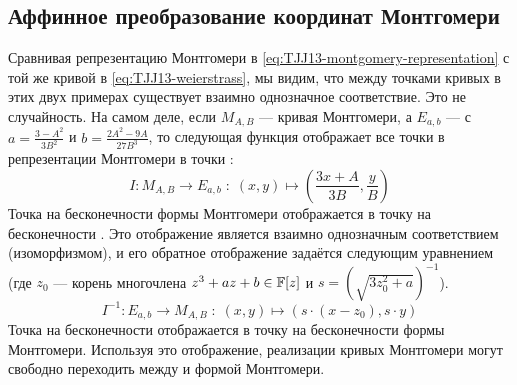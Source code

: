 \subsection{Аффинное преобразование координат Монтгомери} Сравнивая репрезентацию Монтгомери в \eqref{eq:TJJ13-montgomery-representation} с  той же кривой в \eqref{eq:TJJ13-weierstrass}, мы видим, что между точками кривых в этих двух примерах существует взаимно однозначное соответствие. Это не случайность. На самом деле, если $M_{A,B}$ — кривая Монтгомери, а $E_{a,b}$ —  с $a = \frac{3-A^2}{3B^2}$ и $b= \frac{2A^2 -9A}{27B^3}$, то следующая функция отображает все точки в репрезентации Монтгомери в точки :
\begin{equation}
I: M_{A,B} \to E_{a,b}\; : \; (x,y) \mapsto \left(\frac{3x + A}{3B}, \frac{y}{B}\right)
\end{equation}
Точка на бесконечности формы Монтгомери отображается в точку на бесконечности . Это отображение является взаимно однозначным соответствием (изоморфизмом), и его обратное отображение задаётся следующим уравнением (где $z_0$ — корень многочлена $z^3 + a z + b \in \mathbb{F}[z]$ и $s=({\sqrt{3z_0^{2}+a}})^{-1}$).
\begin{equation}
I^{-1}: E_{a,b} \to M_{A,B}\; : \; (x,y) \mapsto \left(s\cdot(x-z_0), s\cdot y\right)
\end{equation}
Точка на бесконечности  отображается в точку на бесконечности формы Монтгомери. Используя это отображение, реализации кривых Монтгомери могут свободно переходить между  и формой Монтгомери. 
 
